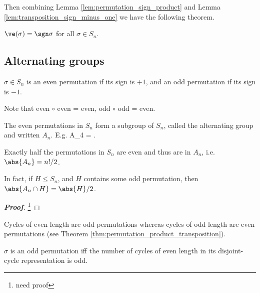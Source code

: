 Then combining Lemma \ref{lem:permutation_sign_product} and Lemma \ref{lem:transposition_sign_minus_one} we have the following theorem.

\begin{theorem}
$\ve(\sigma) = \sgn\sigma$ for all $\sigma \in S_n$.
\end{theorem}



\subsection{Alternating groups}\label{subsec:alternating_groups}%

\begin{definition}
$\sigma \in S_n$ is an even permutation if its sign is $+1$, and an odd permutation if its sign is $-1$.
\end{definition}

\begin{remark}
Note that even $\circ$ even = even, odd $\circ$ odd = even.%
\end{remark}

\begin{definition}\label{def:alternating_group}
The even permutations in $S_n$ form a subgroup of $S_n$, called the alternating group and written $A_n$. E.g.
\beast
A_4 = .
\eeast
\end{definition}

\begin{theorem}
Exactly half the permutations in $S_n$ are even and thus are in $A_n$, i.e. $\abs{A_n} = n!/2$.

In fact, if $H\leq S_n$, and $H$ contains some odd permutation, then $\abs{A_n\cap H} = \abs{H}/2$.
\end{theorem}

\begin{proof}[\bf Proof]
\footnote{need proof}
\end{proof}

\begin{remark}
Cycles of even length are odd permutations whereas cycles of odd length are even permutations (see Theorem \ref{thm:permutation_product_transposition}).
\end{remark}

\begin{corollary}
$\sigma$ is an odd permutation iff the number of cycles of even length in its disjoint-cycle representation is odd.
\end{corollary}


